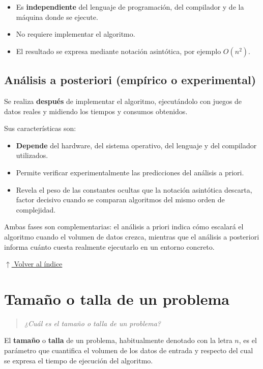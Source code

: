 \documentclass[12pt]{article}
\newcommand{\volverindice}{%
    \vspace{1em}%
    \begin{flushright}%
        \hyperlink{indice}{\small $\uparrow$ Volver al índice}%
    \end{flushright}%
}
\newcommand{\enunciado}[1]{%
    \begin{quote}
        \itshape #1
    \end{quote}
}
\begin{document}
\begin{itemize}[leftmargin=2em]
    \item Es \textbf{independiente} del lenguaje de programación, del compilador y de la máquina donde se ejecute.
    \item No requiere implementar el algoritmo.
    \item El resultado se expresa mediante notación asintótica, por ejemplo $O(n^2)$.
\end{itemize}

\subsection{Análisis a posteriori (empírico o experimental)}

Se realiza \textbf{después} de implementar el algoritmo, ejecutándolo con juegos de datos reales y midiendo los tiempos y consumos obtenidos.

Sus características son:

\begin{itemize}[leftmargin=2em]
    \item \textbf{Depende} del hardware, del sistema operativo, del lenguaje y del compilador utilizados.
    \item Permite verificar experimentalmente las predicciones del análisis a priori.
    \item Revela el peso de las constantes ocultas que la notación asintótica descarta, factor decisivo cuando se comparan algoritmos del mismo orden de complejidad.
\end{itemize}

Ambas fases son complementarias: el análisis a priori indica cómo escalará el algoritmo cuando el volumen de datos crezca, mientras que el análisis a posteriori informa cuánto cuesta realmente ejecutarlo en un entorno concreto.

\volverindice
\newpage


\section{Tamaño o talla de un problema}

\enunciado{¿Cuál es el tamaño o talla de un problema?}

El \textbf{tamaño} o \textbf{talla} de un problema, habitualmente denotado con la letra $n$, es el parámetro que cuantifica el volumen de los datos de entrada y respecto del cual se expresa el tiempo de ejecución del algoritmo.
\end{document}
